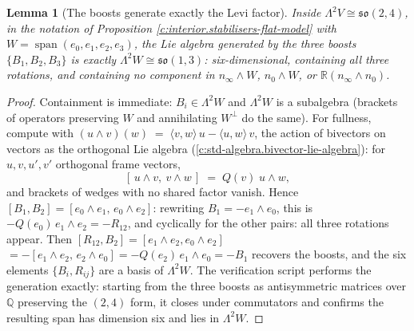 \documentclass[11pt]{article}
\newtheorem{lemma}[theorem]{Lemma}
\theoremstyle{definition}
\theoremstyle{plain}
\newcommand{\changedmark}[2]{\marginpar{\raggedright\scriptsize\color{#1}#2}}
\providecommand{\R}{}\renewcommand{\R}{\mathbb{R}}
\providecommand{\nInf}{}\renewcommand{\nInf}{n_\infty}
\providecommand{\nO}{}\renewcommand{\nO}{n_0}
\providecommand{\ip}{}\renewcommand{\ip}[2]{\langle #1, #2\rangle}
\begin{document}
\begin{lemma}[The boosts generate exactly the Levi factor]\label{c:interior.boosts-generate-exactly-levi-factor}
\changedmark{gray}{reworded}
Inside $\Lambda^2 V \cong \mathfrak{so}(2,4)$, in the notation of Proposition \ref{c:interior.stabilisers-flat-model} with $W = \operatorname{span}(e_0, e_1, e_2, e_3)$, the Lie algebra generated by the three boosts $\{B_1, B_2, B_3\}$ is exactly $\Lambda^2 W \cong \mathfrak{so}(1,3)$: six-dimensional, containing all three rotations, and containing no component in $\nInf \wedge W$, $\nO \wedge W$, or $\R(\nInf\wedge\nO)$.
\end{lemma}
\begin{proof}
Containment is immediate: $B_i \in \Lambda^2 W$ and $\Lambda^2 W$ is a subalgebra (brackets of operators preserving $W$ and annihilating $W^\perp$ do the same). For fullness, compute with $(u \wedge v)(w) \;=\; \ip{v}{w}\,u - \ip{u}{w}\,v$, the action of bivectors on vectors as the orthogonal Lie algebra (\ref{c:std-algebra.bivector-lie-algebra}): for $u,v,u',v'$ orthogonal frame vectors,
\[
[\,u\wedge v,\ v\wedge w\,] \;=\; Q(v)\; u\wedge w ,
\]
and brackets of wedges with no shared factor vanish. Hence $[B_1, B_2] = [e_0\wedge e_1,\, e_0 \wedge e_2]$: rewriting $B_1 = -e_1\wedge e_0$, this is $-Q(e_0)\, e_1\wedge e_2 = -R_{12}$, and cyclically for the other pairs: all three rotations appear. Then $[R_{12}, B_2] = [e_1\wedge e_2, e_0\wedge e_2]$ $= -[e_1\wedge e_2,\, e_2\wedge e_0] = -Q(e_2)\,e_1\wedge e_0 = -B_1$ recovers the boosts, and the six elements $\{B_i, R_{ij}\}$ are a basis of $\Lambda^2 W$. The verification script performs the generation exactly: starting from the three boosts as antisymmetric matrices over $\mathbb{Q}$ preserving the $(2,4)$ form, it closes under commutators and confirms the resulting span has dimension six and lies in $\Lambda^2 W$.

\end{proof}
\end{document}
